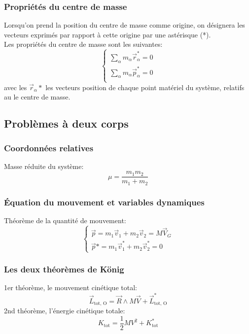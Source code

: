 \documentclass{article}
\numberwithin{equation}{section}
\begin{document}
\subsubsection{Propriétés du centre de masse}
Lorsqu'on prend la position du centre de masse comme origine, on désignera les vecteurs exprimés par rapport à cette origine par une astérisque (*). \\

Les propriétés du centre de masse sont les suivantes:
\begin{equation}
	\begin{cases}
		\sum_\alpha m_\alpha \vec r_\alpha^* = 0 \\
		\sum_\alpha m_\alpha \vec p_\alpha^* =0 \\
	\end{cases}
\end{equation} 
avec les \(\vec r_\alpha *\) les vecteurs position de chaque point matériel du système, relatifs au le centre de masse.

\subsection{Problèmes à deux corps}

\subsubsection{Coordonnées relatives} %
Masse réduite du système:
\begin{equation}
	\boxed{ \mu = \frac{m_1m_2}{m_1 + m_2} }
\end{equation}

\subsubsection{Équation du mouvement et variables dynamiques} %
Théorème de la quantité de mouvement:
\begin{equation}
	\begin{cases}
		\vec p = m_1 \vec v_1 + m_2 \vec v_2 = M \vec V_G \\
		\vec p * = m_1 \vec v_1^* + m_2 \vec v_2^* = 0
	\end{cases}
\end{equation}

\subsubsection{Les deux théorèmes de König}
1er théorème, le mouvement cinétique total:
\begin{equation}
	\boxed{ \vec L_\text{tot, O} = \vec R \wedge M \vec V + \vec L_\text{tot, O}^* }
\end{equation}
2nd théorème, l'énergie cinétique totale:
\begin{equation}
	K_\text{tot} = \frac{1}{2}MV^2 + K_\text{tot}^*
\end{equation}
\end{document}
